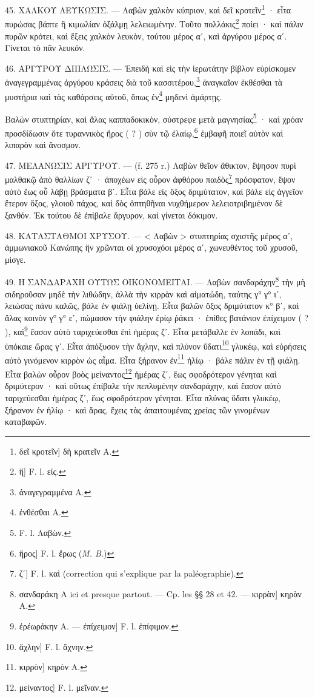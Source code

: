 \documentclass[a4paper, 11pt, oneside, polutonikogreek, french]{article}
\begin{document}
45. ΧΑΛΚΟΥ ΛΕΥΚΩΣΙΣ. --- Λαβὼν χαλκὸν κύπριον, καὶ δεῖ κροτεῖν\footnote{δεῖ κροτεῖν] δὴ κρατεῖν A.} · εἶτα πυρώσας βάπτε ἢ κιμωλίαν ὀξάλμῃ λελειωμένην. Τοῦτο πολλάκις\footnote{ἢ] F. l. εἰς.} ποίει · καὶ πάλιν πυρῶν κρότει, καὶ ἕξεις χαλκὸν λευκὸν, τούτου μέρος αʹ, καὶ ἀργύρου μέρος αʹ. Γίνεται τὸ πᾶν λευκόν.

46. ΑΡΓΥΡΟΥ ΔΙΠΛΩΣΙΣ. --- Ἐπειδὴ καὶ εἰς τὴν ἱερωτάτην βίβλον εὑρίσκομεν ἀναγεγραμμένας ἀργύρου κράσεις διὰ τοῦ κασσιτέρου,\footnote{ἀναγεγραμμένα A.} ἀναγκαῖον ἐκθέσθαι τὰ μυστήρια καὶ τὰς καθάρσεις αὐτοῦ, ὅπως ἐν\footnote{ἐνθέσθαι A.} μηδενὶ ἁμάρτῃς.

Βαλὼν στυπτηρίαν, καὶ ἅλας καππαδοκικὸν, σύστρεφε μετὰ μαγνησίας\footnote{F. l. Λαβὼν.} · καὶ χρόαν προσδίδωσιν ὅτε τυραννικὸς ἥρος ( ? ) σὺν τῷ ἐλαίῳ,\footnote{ἥρος] F. l. ἔρως (\emph{M. B.})} ἐμβαφῆ ποιεῖ αὐτὸν καὶ λιπαρὸν καὶ ἄνοσμον.

47. ΜΕΛΑΝΩΣΙΣ ΑΡΓΥΡΟΥ. --- (f. 275 r.) Λαβὼν θεῖον ἄθικτον, ἕψησον πυρὶ μαλθακῷ ἀπὸ θαλλίων ζʹ · ἀποχέων εἰς οὖρον ἀφθόρου παιδὸς\footnote{ζʹ] F. l. καὶ (correction qui s'explique par la paléographie).} πρόσφατον, ἕψον αὐτὸ ἕως οὗ λάβῃ βράσματα βʹ. Εἶτα βάλε εἰς ὄξος δριμύτατον, καὶ βάλε εἰς ἀγγεῖον ἕτερον ὄξος, γλοιοῦ πάχος, καὶ δὸς ὀπτηθῆναι νυχθήμερον λελειοτριβημένον δὲ ξανθόν. Ἐκ τούτου δὲ ἐπίβαλε ἄργυρον, καὶ γίνεται δόκιμον.

48. ΚΑΤΑΣΤΑΘΜΟΙ ΧΡΥΣΟΥ. --- < Λαβὼν > στυπτηρίας σχιστῆς μέρος αʹ, ἀμμωνιακοῦ Κανώπης ἣν χρῶνται οἱ χρυσοχόοι μέρος αʹ, χωνευθέντος τοῦ χρυσοῦ, μίσγε.

49. Η ΣΑΝΔΑΡΑΧΗ ΟΥΤΩΣ ΟΙΚΟΝΟΜΕΙΤΑΙ. --- Λαβὼν σανδαράχην\footnote{σανδαράκη A ici et presque partout. --- Cp. les §§ 28 et 42. --- κιρρὰν] κηρὰν A.} τὴν μὴ σιδηροῦσαν μηδὲ τὴν λιθώδην, ἀλλὰ τὴν κιρρὰν καὶ αἱματώδη, ταύτης γ° γ° ιʹ, λειώσας πάνυ καλῶς, βάλε ἐν φιάλῃ ὑελίνῃ. Εἶτα βαλῶν ὄξος δριμύτατον κ° βʹ, καὶ ἅλας κοινὸν γ° γ° εʹ, πώμασον τὴν φιάλην ἐρίῳ ῥάκει · ἐπίθες βατάνιον ἐπίχειμον ( ? ), καὶ\footnote{ἐρέωράκην A. --- ἐπίχειμον] F. l. ἐπίφιμον.} ἔασον αὐτὸ ταριχεύεσθαι ἐπὶ ἡμέρας ζʹ. Εἶτα μετάβαλλε ἐν λοπάδι, καὶ ὑπόκαιε ὥρας γʹ. Εἶτα ἀπόξυσον τὴν ἄχλην, καὶ πλύνον ὕδατι\footnote{ἄχλην] F. l. ἄχνην.} γλυκέῳ, καὶ εὑρήσεις αὐτὸ γινόμενον κιρρὸν ὡς αἷμα. Εἶτα ξήρανον ἐν\footnote{κιρρὸν] κηρὸν A.} ἡλίῳ · βάλε πάλιν ἐν τῇ φιάλῃ. Εἶτα βαλὼν οὖρον βοὸς μείναντος\footnote{μείναντος] F. l. μεῖναν.} ἡμέρας ζʹ, ἕως σφοδρότερον γένηται καὶ δριμύτερον · καὶ οὕτως ἐπίβαλε τὴν πεπλυμένην σανδαράχην, καὶ ἔασον αὐτὸ ταριχεύεσθαι ἡμέρας ζʹ, ἕως σφοδρότερον γένηται. Εἶτα πλύνας ὕδατι γλυκέῳ, ξήρανον ἐν ἡλίῳ · καὶ ἄρας, ἔχεις τὰς ἀπαιτουμένας χρείας τῶν γινομένων καταβαφῶν.
\end{document}
